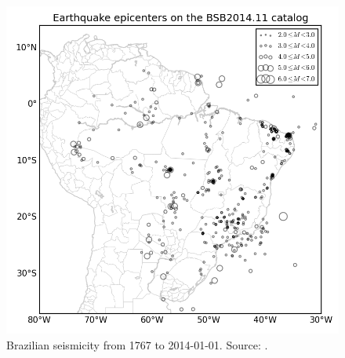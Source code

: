 \documentclass[draft, grl]{agutex}
\begin{document}





\newpage


\begin{figure}
	\includegraphics[width=0.99\linewidth]{z_img_seismicity}
	\caption{Brazilian seismicity from 1767 to 2014-01-01. Source: \citep{bsb_2014}.}
	\label{fig_seismicity}
\end{figure}
\end{document}
